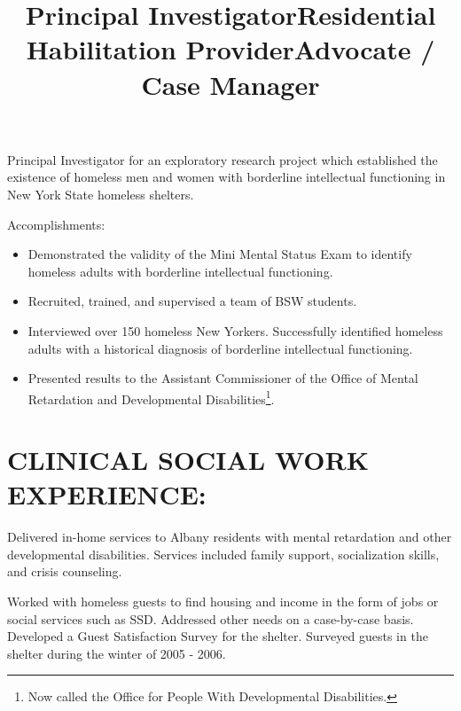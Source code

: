 \documentclass[line, mm, 10pt]{res}
\begin{document}
\begin{resume}
  \title{Principal Investigator}
  \begin{position}
    Principal Investigator for an exploratory research project which
    established the existence of homeless men and women with
    borderline intellectual functioning in New York State homeless
    shelters.

    Accomplishments:
    \begin{itemize}
    \item Demonstrated the validity of the Mini Mental Status Exam to
      identify homeless adults with borderline intellectual functioning.
    \item Recruited, trained, and supervised a team of BSW students.
    \item Interviewed over 150 homeless New Yorkers. Successfully
      identified homeless adults with a historical diagnosis of
      borderline intellectual functioning.
    \item Presented results to the Assistant Commissioner
      of the Office of Mental Retardation and Developmental
      Disabilities\footnote{Now called the Office for People With
        Developmental Disabilities.}.
    \end{itemize}
  \end{position}


  \section{CLINICAL SOCIAL WORK EXPERIENCE:}

  \title{Residential Habilitation Provider}
  \begin{position}
    Delivered in-home services to Albany residents with mental
    retardation and other developmental disabilities. Services included
    family support, socialization skills, and crisis counseling.
  \end{position}

  \title{Advocate / Case Manager}
  \begin{position}
    Worked with homeless guests to find housing and income in the form
    of jobs or social services such as SSD. Addressed other needs on a case-by-case
    basis. Developed a Guest Satisfaction Survey for the shelter. Surveyed
    guests in the shelter during the winter of 2005 - 2006.
  \end{position}


\end{resume}
\end{document}
